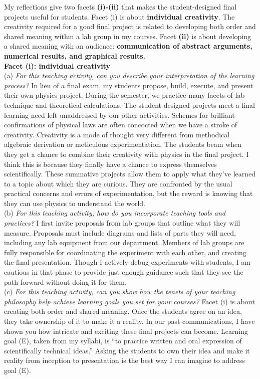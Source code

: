 \documentclass[../../../main.tex]{subfiles}
\begin{document}
My reflections give two facets \textbf{(i)-(ii)} that makes the student-designed final projects useful for students.  Facet (i) is about \textbf{individual creativity}.  The creativity required for a good final project is related to developing both order and shared meaning within a lab group in my courses.  Facet \textbf{(ii)} is about developing a shared meaning with an audience: \textbf{communication of abstract arguments, numerical results, and graphical results.}
\\
\vspace{0.25cm}
\textbf{Facet (i): individual creativity}
\\
\vspace{0.25cm}
(a) \textit{For this teaching activity, can you describe your interpretation of the learning process?} In lieu of a final exam, my students propose, build, execute, and present their own physics project.  During the semester, we practice many facets of lab technique and theoretical calculations.  The student-designed projects meet a final learning need left unaddressed by our other activities.  Schemes for brilliant confirmations of physical laws are often concocted when we have a stroke of creativity. Creativity is a mode of thought very different from methodical algebraic derivation or meticulous experimentation.  The students beam when they get a chance to combine their creativity with physics in the final project.  I think this is because they finally have a chance to express themselves scientifically.  These summative projects allow them to apply what they've learned to a topic about which they are curious.  They are confronted by the usual practical concerns and errors of experimentation, but the reward is knowing that they can use physics to understand the world. 
\\
\vspace{0.25cm}
(b) \textit{For this teaching activity, how do you incorporate teaching tools and practices?}  I first invite proposals from lab groups that outline what they will measure.  Proposals must include diagrams and lists of parts they will need, including any lab equipment from our department.  Members of lab groups are fully responsible for coordinating the experiment with each other, and creating the final presentation.  Though I actively debug experiments with students, I am cautious in that phase to provide just enough guidance such that they see the path forward without doing it for them.
\\
\vspace{0.25cm}
(c) \textit{For this teaching activity, can you show how the tenets of your teaching philosophy help achieve learning goals you
set for your courses?} Facet (i) is about creating both order and shared meaning.  Once the students agree on an idea, they take ownership of it to make it a reality.  In our past communications, I have shown you how intricate and exciting these final projects can become.  Learning goal (E), taken from my syllabi, is ``to practice written and oral expression of scientifically technical ideas.''  Asking the students to own their idea and make it reality from inception to presentation is the best way I can imagine to address goal (E).
\end{document}
